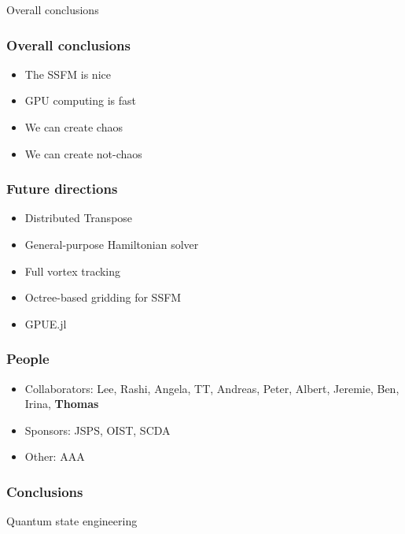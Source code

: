 \documentclass{beamer}
\begin{document}
\begin{frame}
\center \huge Overall conclusions
\end{frame}

\begin{frame}
\frametitle{Overall conclusions}

\begin{itemize}
\item The SSFM is nice
\item GPU computing is fast
\item We can create chaos
\item We can create not-chaos
\end{itemize}
\end{frame}

\begin{frame}
\frametitle{Future directions}
\begin{itemize}
\item Distributed Transpose
\item General-purpose Hamiltonian solver
\item Full vortex tracking
\item Octree-based gridding for SSFM
\item GPUE.jl
\end{itemize}
\end{frame}

\begin{frame}
\frametitle{People}
\begin{itemize}
\item Collaborators: Lee, Rashi, Angela, TT, Andreas, Peter, Albert, Jeremie, Ben, Irina, \textbf{Thomas}
\item Sponsors: JSPS, OIST, SCDA
\item Other: AAA
\end{itemize}
\end{frame}

\begin{frame}
\frametitle{Conclusions}
\end{frame}

\begin{frame}
\center \huge Quantum state engineering
\end{frame}
\end{document}
